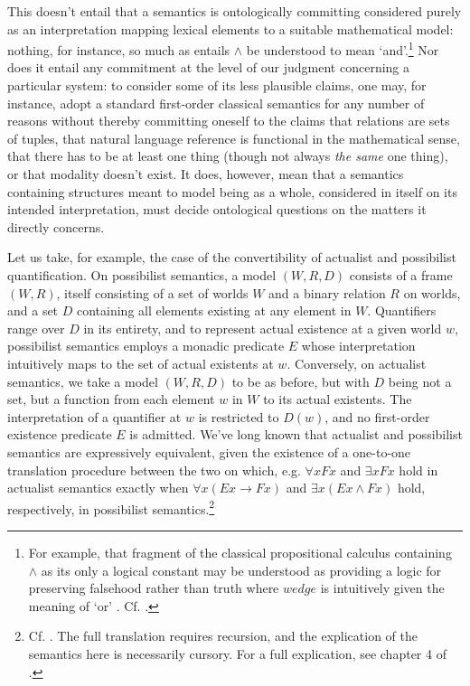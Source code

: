 \documentclass[]{article}
\begin{document}
This doesn't entail that a semantics is ontologically committing considered purely as an interpretation mapping lexical elements to a suitable mathematical model: 
nothing, for instance, so much as entails $\wedge$ be understood to mean `and'.\footnote{For example, 
	that fragment of the classical propositional calculus containing $\wedge$ as its only a logical constant may be understood as providing a logic for preserving falsehood rather than truth 
	where $wedge$ is intuitively given the meaning of `or' . Cf. \autocite[222]{Kripke2015}.}
Nor does it entail any commitment at the level of our judgment concerning a particular system: 
to consider some of its less plausible claims, 
one may, for instance, adopt a standard first-order classical semantics for any number of reasons 
without thereby committing oneself to the claims 
that relations are sets of tuples, 
that natural language reference is functional in the mathematical sense, 
that there has to be at least one thing (though not always \emph{the same} one thing), 
or that modality doesn't exist.
It does, however, mean
that a semantics containing structures meant to model being as a whole, 
considered in itself on its intended interpretation, 
must decide ontological questions on the matters it directly concerns. 

Let us take, for example, the case of the convertibility of actualist and possibilist quantification. 
On possibilist semantics, a model $(W, R, D)$ consists of a frame $(W, R)$, 
itself consisting of a set of worlds $W$ and a binary relation $R$ on worlds, 
and a set $D$ containing all elements existing at any element in $W$. 
Quantifiers range over $D$ in its entirety, 
and to represent actual existence at a given world $w$, 
possibilist semantics employs a monadic predicate $E$ 
whose interpretation intuitively maps to the set of actual existents at $w$. 
Conversely, on actualist semantics, 
we take a model $(W, R, D)$ to be as before, 
but with $D$ being not a set, but a function from each element $w$ in $W$ to its actual existents. 
The interpretation of a quantifier at $w$ is restricted to $D(w)$, 
and no first-order existence predicate $E$ is admitted.
We've long known that actualist and possibilist semantics are expressively equivalent, 
given the existence of a one-to-one translation procedure between the two on which, e.g. 
$\forall x Fx $ and $\exists x Fx$ hold in actualist semantics 
exactly when $\forall x (Ex \rightarrow Fx)$ and $\exists x(Ex \wedge Fx)$ hold, respectively, in possibilist semantics.\footnote{
	Cf. \autocite{Lejewski1954}. 
	The full translation requires recursion, 
	and the explication of the semantics here is necessarily cursory. 
	For a full explication, see chapter 4 of \autocite{Fitting1998}.}
\end{document}
